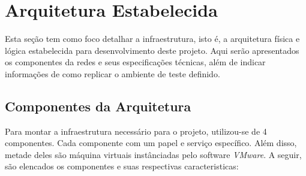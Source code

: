 \chapter{Arquitetura Estabelecida}
\label{chap:Arquitetura}

	Esta seção tem como foco detalhar a infraestrutura, isto é, a arquitetura física e lógica estabelecida para desenvolvimento deste projeto. Aqui serão apresentados os componentes da redes e seus especificações técnicas, além de indicar informações de como replicar o ambiente de teste definido.

	\section{Componentes da Arquitetura}
	\label{sec:Arquitetura_Componentes}

		Para montar a infraestrutura necessário para o projeto, utilizou-se de 4 componentes. Cada componente com um papel e serviço específico. Além disso, metade deles são máquina virtuais instânciadas pelo software \emph{VMware}. A seguir, são elencados os componentes e suas respectivas caracteristicas:

